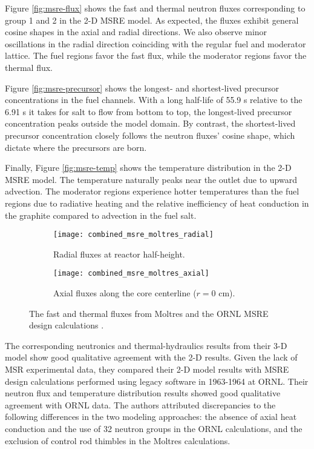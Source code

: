 Figure \ref{fig:msre-flux} shows the fast and thermal neutron fluxes
corresponding to group 1 and 2 in the 2-D \gls{MSRE} model. As expected, the
fluxes exhibit general cosine shapes in the axial and radial directions. We
also observe minor oscillations in the radial direction coinciding with the
regular fuel and moderator lattice. The fuel regions favor the fast flux, while
the moderator regions favor the thermal flux.

Figure \ref{fig:msre-precursor}
shows the longest- and shortest-lived precursor concentrations in the fuel
channels. With a long half-life of 55.9 s relative to the 6.91 s it takes for
salt to flow from bottom to top, the longest-lived precursor concentration peaks
outside the model domain. By contrast, the shortest-lived precursor
concentration closely follows the neutron fluxes' cosine shape, which
dictate where the precursors are born.

Finally, Figure \ref{fig:msre-temp}
shows the temperature distribution in the 2-D \gls{MSRE} model. The temperature
naturally peaks near the outlet due to upward advection. The moderator regions
experience hotter temperatures than the fuel regions due to radiative heating
and the relative inefficiency of heat conduction in the graphite compared to
advection in the fuel salt.

\begin{figure}[htb!]
	\centering
	\begin{subfigure}[h]{0.45\columnwidth}
	    \texttt{[image: combined\_msre\_moltres\_radial]}
	    \caption{Radial fluxes at reactor half-height.}
	    \label{fig:msre-flux-radial}
	\end{subfigure}
	\hfill
	\begin{subfigure}[h]{0.45\columnwidth}
	    \texttt{[image: combined\_msre\_moltres\_axial]}
	    \caption{Axial fluxes along the core centerline ($r=0$ cm).}
	    \label{fig:msre-flux-axial}
	\end{subfigure}
	\caption{The fast and thermal fluxes from
	Moltres \cite{lindsay_introduction_2018} and the \gls{ORNL} \gls{MSRE}
	design calculations \cite{briggs_molten-salt_1964}.}
\end{figure}

The corresponding neutronics and thermal-hydraulics results from their 3-D model
show good qualitative agreement with the 2-D results. Given the lack of
\gls{MSR} experimental data, they compared their 2-D model results with
\gls{MSRE} design calculations performed using legacy software in 1963-1964 at
\gls{ORNL}. Their neutron flux and temperature distribution results showed good
qualitative agreement with \gls{ORNL} data. The authors attributed
discrepancies to the following differences in the two modeling approaches: the
absence of axial heat conduction and the use of 32 neutron groups in the
\gls{ORNL} calculations, and the exclusion of control rod thimbles in the
Moltres calculations.


